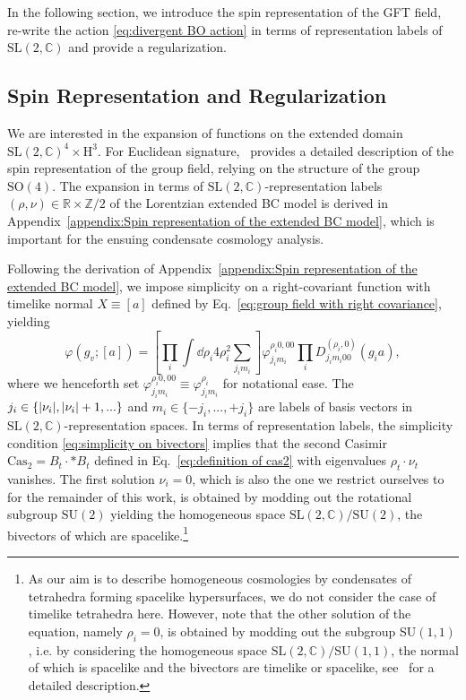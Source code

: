 \documentclass[11pt,a4paper]{article}
\newcommand{\R}{\mathbb R}
\newcommand{\C}{\mathbb C}
\newcommand{\cas}{\textrm{Cas}}     %
\newcommand{\SU}{\text{SU$(2)$}}
\newcommand{\SL}{\text{SL$(2,\C)$}}
\newcommand{\HH}{\text{H}^3}
\begin{document}
In the following section, we introduce the spin representation of the GFT field, re-write the action \eqref{eq:divergent BO action} in terms of representation labels of $\SL$ and provide a regularization.

\subsection{Spin Representation and Regularization }\label{subsec:Spin Representation and Regularization of Group Field}

We are interested in the expansion of functions on the extended domain $\SL^4\times\HH$. 
For Euclidean signature,~\cite{Baratin:2011tx} provides a detailed description of the spin representation of the group field, relying on the structure of the group $\text{SO}(4)$. 
The expansion in terms of $\SL$-representation labels $(\rho,\nu)\in\R\times\mathbb{Z}/2$ of the Lorentzian extended BC model is derived in Appendix~\ref{appendix:Spin representation of the extended BC model}, which is important for the ensuing condensate cosmology analysis.

Following the derivation of Appendix~\ref{appendix:Spin representation of the extended BC model}, we impose simplicity on a right-covariant function with timelike normal $X\equiv[a]$ defined by Eq.~\eqref{eq:group field with right covariance}, yielding
%
\begin{equation}\label{eq:group field with right covariance, simplicity}
\varphi(g_v;[a])
=
\left[\prod_i \int\dd{\rho_i}4\rho_i^2\sum_{j_i m_i}\right]\varphi^{\rho_i0,00}_{j_i m_i}\prod_{i} D^{(\rho_i,0)}_{j_i m_i 00}(g_ia),
\end{equation}
%
where we henceforth set $\varphi^{\rho_i 0,00}_{j_i m_i} \equiv \varphi^{\rho_i}_{j_i m_i}$ for notational ease. The $j_i\in\{\abs{\nu_i},\abs{\nu_i}+1,...\}$ and $m_i\in\{-j_i,...,+j_i\}$ are labels of basis vectors in $\SL$-representation spaces. In terms of representation labels, the simplicity condition \eqref{eq:simplicity on bivectors} implies that the second Casimir $\cas_2 = B_t\cdot *B_t$ defined in Eq.~\eqref{eq:definition of cas2} with eigenvalues $\rho_t\cdot \nu_t$ vanishes. The first solution $\nu_i = 0$, which is also the one we restrict ourselves to for the remainder of this work, is obtained by modding out the rotational subgroup $\SU$ yielding the homogeneous space $\SL/\SU$, the bivectors of which are spacelike.\footnote{As our aim is to describe homogeneous cosmologies by condensates of tetrahedra forming spacelike hypersurfaces, we do not consider the case of timelike tetrahedra here. However, note that the other solution of the equation, namely $\rho_i = 0$, is obtained by modding out the subgroup SU$(1,1)$, i.e. by considering the homogeneous space $\SL/$SU$(1,1)$, the normal of which is spacelike and the bivectors are timelike or spacelike, see~\cite{Perez:2000ep} for a detailed description.}
\end{document}
